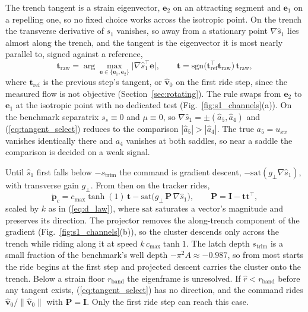 \documentclass[lettersize,journal]{IEEEtran}
\begin{document}
The trench tangent is a strain eigenvector, $\mathbf{e}_2$ on an
attracting segment and $\mathbf{e}_1$ on a repelling one, so no fixed
choice works across the isotropic point. On the trench the transverse
derivative of $s_1$ vanishes, so away from a stationary point
$\nabla\hat{s}_1$ lies almost along the trench, and the tangent is the
eigenvector it is most nearly parallel to, signed against a reference,
\begin{equation}
    \mathbf{t}_{\mathrm{raw}} =
    \arg\max_{\mathbf{e} \in \{\mathbf{e}_1, \mathbf{e}_2\}}
    \bigl\lvert \nabla\hat{s}_1^\top \mathbf{e} \bigr\rvert,
    \qquad
    \mathbf{t} = \mathrm{sgn}\bigl(\mathbf{t}_{\mathrm{ref}}^\top
    \mathbf{t}_{\mathrm{raw}}\bigr)\,\mathbf{t}_{\mathrm{raw}},
    \label{eq:tangent_select}
\end{equation}
where $\mathbf{t}_{\mathrm{ref}}$ is the previous step's tangent, or
$\hat{\mathbf{v}}_0$ on the first ride step, since the measured flow is not
objective (Section~\ref{sec:rotating}). The rule swaps from
$\mathbf{e}_2$ to $\mathbf{e}_1$ at the isotropic point with no dedicated
test (Fig.~\ref{fig:s1_channels}(a)). On the benchmark separatrix
$s_s \equiv 0$ and $\mu \equiv 0$, so $\nabla\hat{s}_1 = \pm(\hat{a}_5,
\hat{a}_4)$ and (\ref{eq:tangent_select}) reduces to the comparison
$|\hat{a}_5| > |\hat{a}_4|$. The true $a_5 = u_{xx}$ vanishes identically
there and $a_4$ vanishes at both saddles, so near a saddle the comparison
is decided on a weak signal.

Until $\hat{s}_1$ first falls below $-s_{\mathrm{trim}}$ the command is
gradient descent, $-\mathrm{sat}(g_\perp\nabla\hat{s}_1)$, with transverse gain
$g_\perp$. From then on
the tracker rides,
\begin{equation}
    \dot{\mathbf{p}}_c =
    c_{\max}\tanh(1)\,\mathbf{t}
    - \mathrm{sat}\!\bigl(g_\perp\,\mathbf{P}\,\nabla\hat{s}_1\bigr),
    \qquad
    \mathbf{P} = \mathbf{I} - \mathbf{t}\mathbf{t}^\top,
    \label{eq:s1_law}
\end{equation}
scaled by $k$ as in (\ref{eq:d_law}), where $\mathrm{sat}$ saturates a
vector's magnitude and preserves its direction. The projector removes
the along-trench component of the gradient
(Fig.~\ref{fig:s1_channels}(b)), so the cluster descends only across the
trench while riding along it at speed $k\,c_{\max}\tanh 1$. The latch
depth $s_{\mathrm{trim}}$ is a small fraction of the benchmark's well
depth $-\pi^2 A \approx -0.987$, so from most starts the ride begins at
the first step and projected descent carries the cluster onto the trench. Below a strain floor $r_{\mathrm{band}}$ the eigenframe is
unresolved. If $\hat{r} < r_{\mathrm{band}}$ before any tangent exists,
(\ref{eq:tangent_select}) has no direction, and the command rides
$\hat{\mathbf{v}}_0/\|\hat{\mathbf{v}}_0\|$ with $\mathbf{P} = \mathbf{I}$.
Only the first ride step can reach this case.
\end{document}
